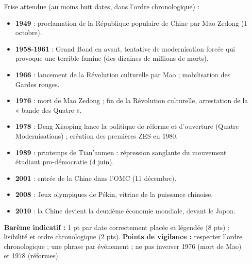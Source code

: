 \documentclass[11pt]{article}
\begin{document}
\begin{corrige}
Frise attendue (au moins huit dates, dans l'ordre chronologique) :
\begin{itemize}
\item \textbf{1949} : proclamation de la République populaire de Chine par Mao Zedong (1\ier{} octobre).
\item \textbf{1958-1961} : Grand Bond en avant, tentative de modernisation forcée qui provoque une terrible famine (des dizaines de millions de morts).
\item \textbf{1966} : lancement de la Révolution culturelle par Mao ; mobilisation des Gardes rouges.
\item \textbf{1976} : mort de Mao Zedong ; fin de la Révolution culturelle, arrestation de la « bande des Quatre ».
\item \textbf{1978} : Deng Xiaoping lance la politique de réforme et d'ouverture (Quatre Modernisations) ; création des premières ZES en 1980.
\item \textbf{1989} : printemps de Tian'anmen : répression sanglante du mouvement étudiant pro-démocratie (4 juin).
\item \textbf{2001} : entrée de la Chine dans l'OMC (11 décembre).
\item \textbf{2008} : Jeux olympiques de Pékin, vitrine de la puissance chinoise.
\item \textbf{2010} : la Chine devient la deuxième économie mondiale, devant le Japon.
\end{itemize}
\textbf{Barème indicatif :} 1 pt par date correctement placée et légendée (8 pts) ; lisibilité et ordre chronologique (2 pts).
\textbf{Points de vigilance :} respecter l'ordre chronologique ; une phrase par événement ; ne pas inverser 1976 (mort de Mao) et 1978 (réformes).
\end{corrige}
\end{document}
